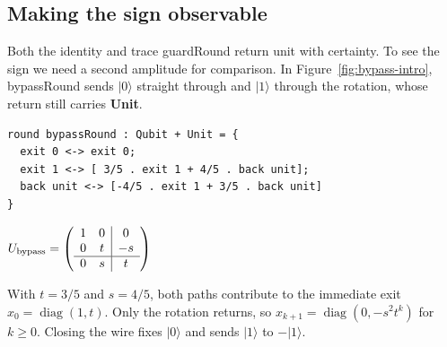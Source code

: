 \documentclass[acmsmall,screen,review,anonymous,nonacm]{acmart}
\newcommand{\storyinlinekwface}{\storyinlineface\bfseries}}
\newcommand{\storyinlineface}{\small\ttfamily}
\newcommand{\storyinlinekwface}{\small\ttfamily\bfseries}
\newcommand{\kw}[1]{\textnormal{\storyinlinekwface #1}}
\newcommand{\code}[1]{\textnormal{\storyinlineface #1}}
\newcommand{\ket}[1]{\lvert #1\rangle}
\numberwithin{equation}{section}
\begin{document}
\subsection{Making the sign observable}

Both the identity and \code{trace guardRound} return \code{unit} with certainty. To see
the sign we need a second amplitude for comparison. In Figure~\ref{fig:bypass-intro},
\code{bypassRound} sends $\ket0$ straight through and $\ket1$ through the rotation, whose
return still carries \kw{Unit}.

\par\smallskip\noindent\begin{minipage}[c]{.66\linewidth}
\begin{lstlisting}
round bypassRound : Qubit + Unit = {
  exit 0 <-> exit 0;
  exit 1 <-> [ 3/5 . exit 1 + 4/5 . back unit];
  back unit <-> [-4/5 . exit 1 + 3/5 . back unit]
}
\end{lstlisting}
\end{minipage}\hfill
\begin{minipage}[c]{.32\linewidth}\centering
\(
U_{\rm bypass}=
 \left(\begin{array}{cc|c}
   1 & 0 & 0\\
   0 & t & -s\\ \hline
   0 & s & t
 \end{array}\right)
\)
\end{minipage}\par
With $t=3/5$ and $s=4/5$, both paths contribute to the immediate exit $x_0=\operatorname{diag}(1,t)$.
Only the rotation returns, so $x_{k+1}=\operatorname{diag}(0,-s^2t^k)$ for $k\ge0$.
Closing the wire fixes $\ket0$ and sends $\ket1$ to $-\ket1$.
\end{document}
